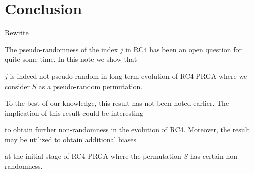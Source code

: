 \documentclass{llncs}
\begin{document}
\section{Conclusion}

Rewrite



The pseudo-randomness of the index $j$ in RC4 has been an open question for quite some time. In this note we show that

$j$ is indeed not pseudo-random in long term evolution of RC4 PRGA where we consider $S$ as a pseudo-random permutation. 

To the best of our knowledge, this result has not been noted earlier. The implication of this result could be interesting 

to obtain further non-randomness in the evolution of RC4. Moreover, the result may be utilized to obtain additional biases 

at the initial stage of RC4 PRGA where the permutation $S$ has certain non-randomness.  
\end{document}
